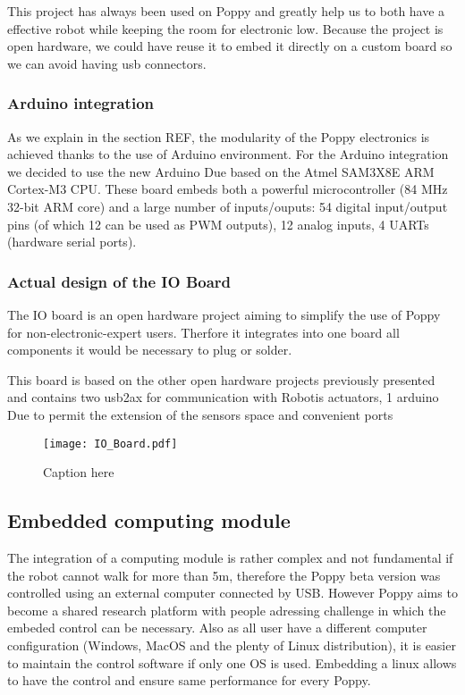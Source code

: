 This project has always been used on Poppy and greatly help us to both have a effective robot while keeping the room for electronic low.
Because the project is open hardware, we could have reuse it to embed it directly on a custom board so we can avoid having usb connectors.

\subsubsection{Arduino integration} %
As we explain in the section REF, the modularity of the Poppy electronics is achieved thanks to the use of Arduino environment. For the Arduino integration we decided to use the new Arduino Due based on the Atmel SAM3X8E ARM Cortex-M3 CPU. These board embeds both a powerful microcontroller (84 MHz 32-bit ARM core) and a large number of inputs/ouputs: 54 digital input/output pins (of which 12 can be used as PWM outputs), 12 analog inputs, 4 UARTs (hardware serial ports).


\subsubsection{Actual design of the IO Board} %
The IO board is an open hardware project aiming to simplify the use of Poppy for non-electronic-expert users. Therfore it integrates into one board all components it would be necessary to plug or solder.

This board is based on the other open hardware projects previously presented and contains two usb2ax for communication with Robotis actuators, 1 arduino Due to permit the extension of the sensors space and convenient ports

\begin{figure}[tb]
    \begin{center}
        \texttt{[image: IO\_Board.pdf]}
    \end{center}
    \caption{Caption here}
    \label{fig:figure1}
\end{figure}


\subsection{Embedded computing module} %

The integration of a computing module is rather complex and not fundamental if the robot cannot walk for more than 5m, therefore the Poppy beta version was controlled using an external computer connected by USB.
However Poppy aims to become a shared research platform with people adressing challenge in which the embeded control can be necessary. Also as all user have a different computer configuration (Windows, MacOS and the plenty of Linux distribution), it is easier to maintain the control software if only one OS is used. Embedding a linux allows to have the control and ensure same performance for every Poppy.

